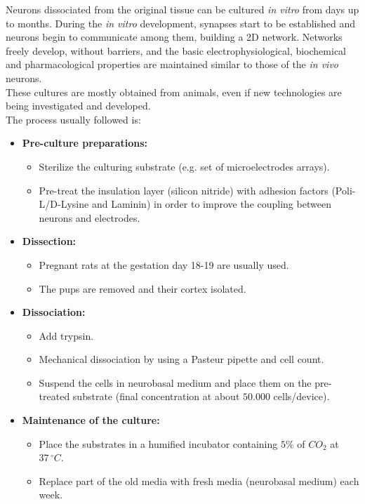 Neurons dissociated from the original tissue can be cultured \textit{in vitro} from 
days up to months. During the \textit{in vitro} development, synapses start to be 
established and neurons begin to communicate among them, building a 2D 
network. Networks freely develop, without barriers, and the basic 
electrophysiological, biochemical and pharmacological properties are 
maintained similar to those of the \textit{in vivo} neurons.\\
These cultures are mostly obtained from animals, even if new technologies 
are being investigated and developed.\\
The process usually followed is:
\begin{itemize}
    \item \textbf{Pre-culture preparations:}
    \begin{itemize}
        \item Sterilize the culturing substrate (e.g. set of 
microelectrodes arrays).
        \item Pre-treat the insulation layer (silicon nitride) with 
adhesion factors (Poli-L/D-Lysine and Laminin) in order to improve the 
coupling between neurons and electrodes.
    \end{itemize}
    
    \item \textbf{Dissection:}
    \begin{itemize}
        \item Pregnant rats at the gestation day 18-19 are usually used. 
        \item The pups are removed and their cortex isolated.
    \end{itemize}
    
    \item \textbf{Dissociation:}
    \begin{itemize}
        \item Add trypsin.
        \item Mechanical dissociation by using a Pasteur pipette and cell 
count.
        \item Suspend the cells in neurobasal medium and place them on the 
pre-treated substrate (final concentration at about \(50.000\) cells/device).
    \end{itemize}
    
    \item \textbf{Maintenance of the culture:}
    \begin{itemize}
        \item Place the substrates in a humified incubator containing \(5\%\) 
of \(CO_2\) at \(37\,{}^{\circ}C\).
        \item Replace part of the old media with fresh media (neurobasal 
medium) each week.
    \end{itemize}
\end{itemize}

